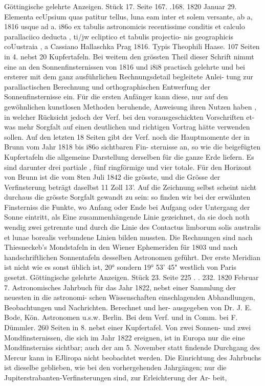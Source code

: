 \documentclass[12pt,a4paper]{article}
\begin{document}
{{{{{{{{Göttingische  gelehrte  Anzeigen.     Stück  17.     Seite  167.  .168.     1820  Januar  29. Elementa  ecUpsium  quas  patitur  tellus,  luna  eam  inter  et  solem  versante,  ab  a,  1816  usque  ad  a.  i86o ex  tabulis  astronomicis  recentissime  conditis  et  calculo  parallaciico  deducta ,  ti/jw  ecliptico  et  tabulis  projectio- nis  geographicis  coUustraia ,  a  Cassiano  Hallaschka  Prag  1816.  Typis  Theophili  Haase.  107  Seiten  in 4.  nebst  20  Kupfertafeln. Bei  weitem  den  grössten  Theil  dieser  Schrift  nimmt  eine  an  den  Sonnenfinsternissen  von  1816  und i8i8  practisch  gelehrte  und  bei  ersterer  mit  dem  ganz  ausführlichen  Rechnungsdetail  begleitete  Anlei- tung zur  parallactischen  Berechnung  und  orthographischen  Entwerfung  der  Sonnenfinsternisse  ein.  Für die  ersten  Anfänger  kann  diese,  nur  auf  den  gewöhnlichen  kunstlosen  Methoden  beruhende,  Anweisung ihren  Nutzen  haben ,  in  welcher  Rücksicht  jedoch  der  Verf.  bei  den  vorausgeschickten  Vorschriften  et- was mehr  Sorgfalt  auf  einen  deutlichen  und  richtigen  Vortrag  hätte  verwenden  sollen.  Auf  den  letzten 18  Seiten  gibt  der  Verf.  noch  die  Hauptmomente  der  in  Brunn  vom  Jahr  1818  bis  i86o  sichtbaren  Fin- sternisse an,  so  wie  die  beigefügten  Kupfertafeln  die  allgemeine  Darstellung  derselben  für  die  ganze Erde  liefern.  Es  sind  darunter  drei  partiale ,  fünf  ringförmige  und  vier  totale.  Für  den  Horizont  von Brunn  ist  die  vom  8ten  Juli  1842  die  grösste,  und  die  Grösse  der  Verfinsterung  beträgt  daselbst  11  Zoll 13'.  Auf  die  Zeichnung  selbst  scheint  nicht  durchaus  die  grösste  Sorgfalt  gewandt  zu  sein:  so  finden wir  bei  der  erwähnten  Finsterniss  die  Funkte,  wo  Anfang  oder  Ende  bei  Aufgang  oder  Untergang  der Sonne  eintritt,  als  Eine  zusammenhängende  Linie  gezeichnet,  da  sie  doch  noth wendig  zwei  getrennte und  durch  die  Linie  des  Contactus  limborum  solis  australis  et  lunae  borealis  verbundene  Linien  bilden mussten.  Die  Rechnungen  sind  nach  Thiesneckeb's  Mondstafeln  in  den  Wiener  Ephemeriden  für  1803 und  nach  handschriftlichen  Sonnentafeln  desselben  Astronomen  geführt.  Der  erste  Meridian  ist  nicht  wie es  sonst  üblich  ist,  20°  sondern  19°  53'  45"  westlich  von  Paris  gesetzt. Göttingische  gelehrte  Anzeigen.    Stück  23.     Seite  225  . .  232.     1820  Februar  7. Astronomisches  Jahrbuch  für  das  Jahr  1822,  nebst  einer  Sammlung  der  neuesten  in  die  astronomi- schen Wissenschaften  einschlagenden  Abhandlungen,  Beobachtungen  und  Nachrichten.  Berechnet  und  her- ausgegeben von  Dr.  J.  E.  Bode,  Kön.  Astronomen  u.s.w.  Berlin.  Bei  dem  Verf.  und  in  Comm.  bei  F. Dümmler.     260  Seiten  in  8.  nebst  einer  Kupfertafel. Von  zwei  Sonnen-  und  zwei  Mondfinsternissen,  die  sich  im  Jahr  1822  ereignen,  ist  in  Europa  nur die  eine  Mondfinsterniss  sichtbar;  auch  der  am  5.  November  statt  findende  Durchgang  des  Mercur  kann in  EJliropa  nicht  beobachtet  werden.  Die  Einrichtung  des  Jahrbuchs  ist  dieselbe  geblieben,  wie  bei  den vorhergehenden  Jahrgängen;  nur  die  Jupiterstrabanten-Verfinsterungen  sind,  zur  Erleichterung  der  Ar- beit, }}}}}}}}
\end{document}
